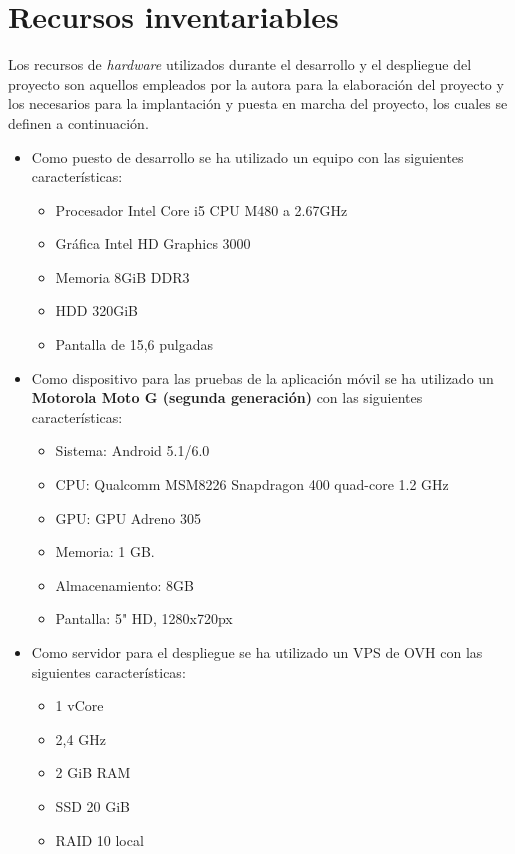 \section{Recursos inventariables}

Los recursos de \textit{hardware} utilizados durante el desarrollo y el
despliegue del proyecto son aquellos empleados por la autora para la elaboración
del proyecto y los necesarios para la implantación y puesta en marcha del
proyecto, los cuales se definen a continuación.

\begin{itemize}
\item Como puesto de desarrollo se ha utilizado un equipo con las siguientes
  características:
  \begin{itemize}
  \item Procesador Intel Core i5 CPU M480 a 2.67GHz
  \item Gráfica Intel HD Graphics 3000
  \item Memoria 8GiB DDR3
  \item HDD 320GiB
  \item Pantalla de 15,6 pulgadas
  \end{itemize}

\item Como dispositivo para las pruebas de la aplicación móvil se ha utilizado
  un \textbf{Motorola Moto G (segunda generación)} con las siguientes
  características:

  \begin{itemize}
  \item Sistema: Android 5.1/6.0
  \item CPU: Qualcomm MSM8226 Snapdragon 400 quad-core 1.2 GHz
  \item GPU: GPU Adreno 305
  \item Memoria: 1 GB.
  \item Almacenamiento: 8GB
  \item Pantalla: 5" HD, 1280x720px
  \end{itemize}

\item Como servidor para el despliegue se ha utilizado un VPS de OVH con
  las siguientes características:
  \begin{itemize}
  \item 1 vCore
  \item 2,4 GHz
  \item 2 GiB RAM
  \item SSD 20 GiB
  \item RAID 10 local
  \end{itemize}  
\end{itemize}


